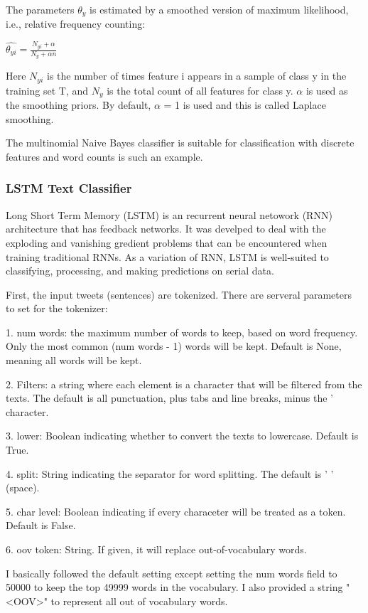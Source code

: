 \documentclass{article}
\begin{document}
The parameters $\theta_y$ is estimated by a smoothed version of maximum likelihood, i.e., relative frequency counting:  

$\hat{\theta_{yi}} = \frac{N_{yi} + \alpha}{N_y + \alpha n}$  

Here $N_{yi}$ is the number of times feature i appears in a sample of class y in the training set T, and $N_y$ is the total count of all features for class y. $\alpha$ is used as the smoothing priors. By default, $\alpha$ = 1 is used and this is called Laplace smoothing.

The multinomial Naive Bayes classifier is suitable for classification with discrete features and word counts is such an example.

\subsubsection{LSTM Text Classifier}
Long Short Term Memory (LSTM) is an recurrent neural netowork (RNN) architecture that has feedback networks. It was develped to deal with the exploding and vanishing gredient problems that can be encountered when training traditional RNNs. As a variation of RNN, LSTM is well-suited to classifying, processing, and making predictions on serial data.


First, the input tweets (sentences) are tokenized. There are serveral parameters to set for the tokenizer:

1. num words: the maximum number of words to keep, based on word frequency. Only the most common (num words - 1) words will be kept. Default is None, meaning all words will be kept.

2. Filters: a string where each element is a character that will be filtered from the texts. The default is all punctuation, plus tabs and line breaks, minus the ' character.

3. lower: Boolean indicating whether to convert the texts to lowercase. Default is True.

4. split: String indicating the separator for word splitting. The default is ' ' (space).

5. char level: Boolean indicating if every characeter will be treated as a token. Default is False.

6. oov token: String. If given, it will replace out-of-vocabulary words.

I basically followed the default setting except setting the num words field to 50000 to keep the top 49999 words in the vocabulary. I also provided a string "<OOV>" to represent all out of vocabulary words.
\end{document}
